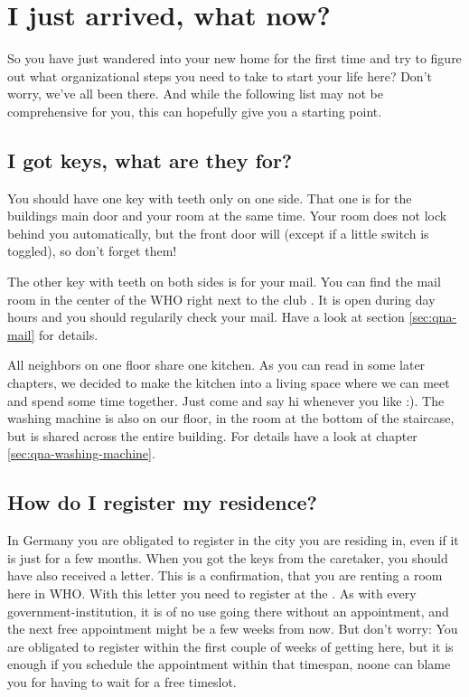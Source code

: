 \chapter{I just arrived, what now?}

So you have just wandered into your new home for the first time and try to figure out what organizational steps you need to take to start your life here? Don't worry, we've all been there. And while the following list may not be comprehensive for you, this  can hopefully give you a starting point.

\section{I got keys, what are they for?}

You should have one key with teeth only on one side. That one is for the buildings main door and your room at the same time. Your room does not lock behind you automatically, but the front door will (except if a little switch is toggled), so don't forget them!

The other key with teeth on both sides is for your mail. You can find the mail room in the center of the WHO right next to the club . It is open during day hours and you should regularily check your mail. Have a look at section \ref{sec:qna-mail} for details.

All neighbors on one floor share one kitchen. As you can read in some later chapters, we decided to make the kitchen into a living space where we can meet and spend some time together. Just come and say hi whenever you like :). The washing machine is also on our floor, in the room at the bottom of the staircase, but is shared across the entire building. For details have a look at chapter \ref{sec:qna-washing-machine}.

\section{How do I register my residence?}

In Germany you are obligated to register in the city you are residing in, even if it is just for a few months. When you got the keys from the caretaker, you should have also received a letter. This  is a confirmation, that you are renting a room here in WHO. With this letter you need to register at the . As with every government-institution, it is of no use going there without an appointment, and the next free appointment might be a few weeks from now. But don't worry: You are obligated to register within the first couple of weeks of getting here, but it is enough if you schedule the appointment within that timespan, noone can blame you for having to wait for a free timeslot.

